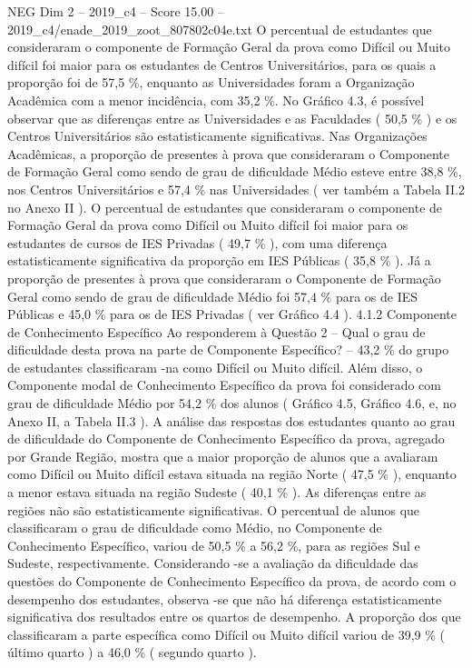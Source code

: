 \begin{textsample}{NEG Dim 2 – 2019\_c4 – Score 15.00 – 2019\_c4/enade\_2019\_zoot\_807802c04e.txt}
O percentual de estudantes que consideraram o componente de Formação Geral da prova como Difícil ou Muito difícil foi maior para os estudantes de Centros Universitários, para os quais a proporção foi de 57,5 \%, enquanto as Universidades foram a Organização Acadêmica com a menor incidência, com 35,2 \%.
No Gráfico 4.3, é possível observar que as diferenças entre as Universidades e as Faculdades ( 50,5 \% ) e os Centros Universitários são estatisticamente significativas.
Nas Organizações Acadêmicas, a proporção de presentes à prova que consideraram o Componente de Formação Geral como sendo de grau de dificuldade Médio esteve entre 38,8 \%, nos Centros Universitários e 57,4 \% nas Universidades ( ver também a Tabela II.2 no Anexo II ).
O percentual de estudantes que consideraram o componente de Formação Geral da prova como Difícil ou Muito difícil foi maior para os estudantes de cursos de IES Privadas ( 49,7 \% ), com uma diferença estatisticamente significativa da proporção em IES Públicas ( 35,8 \% ).
Já a proporção de presentes à prova que consideraram o Componente de Formação Geral como sendo de grau de dificuldade Médio foi 57,4 \% para os de IES Públicas e 45,0 \% para os de IES Privadas ( ver Gráfico 4.4 ). 4.1.2 Componente de Conhecimento Específico Ao responderem à Questão 2 – Qual o grau de dificuldade desta prova na parte de Componente Específico? – 43,2 \% do grupo de estudantes classificaram -na como Difícil ou Muito difícil.
Além disso, o Componente modal de Conhecimento Específico da prova foi considerado com grau de dificuldade Médio por 54,2 \% dos alunos ( Gráfico 4.5, Gráfico 4.6, e, no Anexo II, a Tabela II.3 ).
A análise das respostas dos estudantes quanto ao grau de dificuldade do Componente de Conhecimento Específico da prova, agregado por Grande Região, mostra que a maior proporção de alunos que a avaliaram como Difícil ou Muito difícil estava situada na região Norte ( 47,5 \% ), enquanto a menor estava situada na região Sudeste ( 40,1 \% ).
As diferenças entre as regiões não são estatisticamente significativas.
O percentual de alunos que classificaram o grau de dificuldade como Médio, no Componente de Conhecimento Específico, variou de 50,5 \% a 56,2 \%, para as regiões Sul e Sudeste, respectivamente.
Considerando -se a avaliação da dificuldade das questões do Componente de Conhecimento Específico da prova, de acordo com o desempenho dos estudantes, observa -se que não há diferença estatisticamente significativa dos resultados entre os quartos de desempenho.
A proporção dos que classificaram a parte específica como Difícil ou Muito difícil variou de 39,9 \% ( último quarto ) a 46,0 \% ( segundo quarto ).

\end{textsample}
